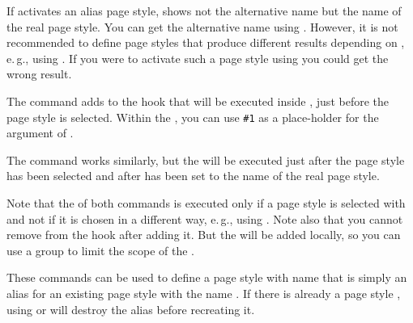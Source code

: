 If  activates an alias page style,
 shows not the alternative name but the name of
the real page style. You can get the
alternative name using . However, it is not
recommended to define page styles that produce different results depending on
, e.\,g., using . If you
were to activate such a page style using 
you could get the wrong result.%
\EndIndexGroup


\begin{Declaration}
\end{Declaration}
The  command adds  to the hook%
 that will be executed inside ,
just before the page style is selected. Within the , you can use
\texttt{\#1} as a place-holder for the argument of
.

The  command works similarly, but the
 will be executed just after the page style has been selected and
after  has been set to the name of
the real page style.

Note that the  of both commands is executed
only if a page style is selected with  and not
if it is chosen in a different way, e.\,g., using
. Note also that you cannot remove
 from the hook after adding it. But the  will be added
locally, so you can use a group to limit the scope of the .%
\EndIndexGroup


\begin{Declaration}
\end{Declaration}
%
%
These commands can be used to define a page style with name  that is simply an alias for an existing page style with the
name . If there is already a page style
, using  or
 will destroy the alias before recreating it.

